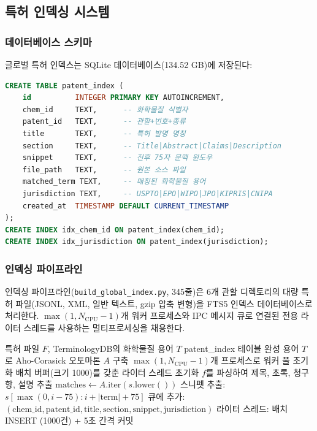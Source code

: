 \documentclass[preprint,12pt]{elsarticle}
\begin{document}
\subsection{특허 인덱싱 시스템}
\label{sec:patent_indexing}

\subsubsection{데이터베이스 스키마}

글로벌 특허 인덱스는 SQLite 데이터베이스(134.52 GB)에 저장된다:

\begin{lstlisting}[language=SQL,caption={특허 인덱스 스키마}]
CREATE TABLE patent_index (
    id          INTEGER PRIMARY KEY AUTOINCREMENT,
    chem_id     TEXT,      -- 화학물질 식별자
    patent_id   TEXT,      -- 관할+번호+종류
    title       TEXT,      -- 특허 발명 명칭
    section     TEXT,      -- Title|Abstract|Claims|Description
    snippet     TEXT,      -- 전후 75자 문맥 윈도우
    file_path   TEXT,      -- 원본 소스 파일
    matched_term TEXT,     -- 매칭된 화학물질 용어
    jurisdiction TEXT,     -- USPTO|EPO|WIPO|JPO|KIPRIS|CNIPA
    created_at  TIMESTAMP DEFAULT CURRENT_TIMESTAMP
);
CREATE INDEX idx_chem_id ON patent_index(chem_id);
CREATE INDEX idx_jurisdiction ON patent_index(jurisdiction);
\end{lstlisting}

\subsubsection{인덱싱 파이프라인}

인덱싱 파이프라인(\texttt{build\_global\_index.py}, 345줄)은 6개 관할 디렉토리의 대량 특허 파일(JSONL, XML, 일반 텍스트, gzip 압축 변형)을 FTS5 인덱스 데이터베이스로 처리한다. $\max(1, N_{\text{CPU}} - 1)$개 워커 프로세스와 IPC 메시지 큐로 연결된 전용 라이터 스레드를 사용하는 멀티프로세싱을 채용한다.

\begin{algorithm}[H]
\caption{특허 인덱싱 파이프라인}
\label{alg:indexing}
\begin{algorithmic}[1]
\REQUIRE 특허 파일 $F$, TerminologyDB의 화학물질 용어 $T$
\ENSURE patent\_index 테이블 완성
\STATE 용어 $T$로 Aho-Corasick 오토마톤 $A$ 구축
\STATE $\max(1, N_{\text{CPU}} - 1)$개 프로세스로 워커 풀 초기화
\STATE 배치 버퍼(크기 1000)를 갖춘 라이터 스레드 초기화
    \STATE $f$를 파싱하여 제목, 초록, 청구항, 설명 추출
        \STATE $\text{matches} \leftarrow A.\text{iter}(s.\text{lower}())$
                \STATE 스니펫 추출: $s[\max(0, i-75) : i+|\text{term}|+75]$
                \STATE 큐에 추가: $(\text{chem\_id}, \text{patent\_id}, \text{title}, \text{section}, \text{snippet}, \text{jurisdiction})$
            \ENDIF
        \ENDFOR
    \ENDFOR
\ENDFOR
\STATE 라이터 스레드: 배치 INSERT (1000건) + 5초 간격 커밋
\end{algorithmic}
\end{algorithm}
\end{document}

